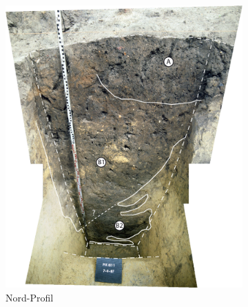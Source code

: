 \begin{figure}[p]
\centering
\begin{subfigure}[t]{\columnwidth}
 \centering
 \includegraphics[width=\columnwidth]{fig/PIK87-1_N-profil_E87-018-26--28-01_2014-01-01.jpg}
 \caption{Nord-Profil}
 \label{fig:PIK87-1_N-Prof}
\end{subfigure}\hfill
\begin{subfigure}[t]{\columnwidth}	
 \centering

\end{subfigure}
\end{figure}
